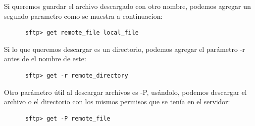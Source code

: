 \documentclass[12pt]{article}
\begin{document}
Si queremos guardar el archivo descargado con otro nombre, podemos agregar un segundo parametro como se muestra a continuacion:
\begin{verbatim}
      sftp> get remote_file local_file
\end{verbatim}
Si lo que queremos descargar es un directorio, podemos agregar el par\'ametro -r antes de el nombre de este:
\begin{verbatim}
      sftp> get -r remote_directory
\end{verbatim}
Otro par\'ametro \'util al descargar archivos es -P, us\'andolo, podemos descargar el archivo o el directorio con los mismos permisos que se ten\'ia en el servidor:
\begin{verbatim}
      sftp> get -P remote_file
\end{verbatim}
\end{document}
